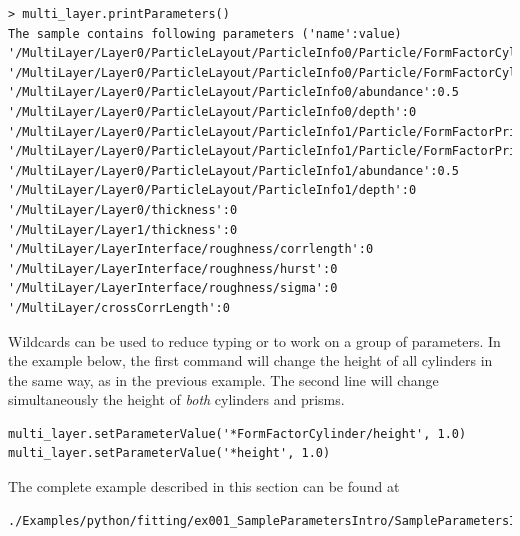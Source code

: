 \begin{lstlisting}[language=shell, style=commandline]
> multi_layer.printParameters()
The sample contains following parameters ('name':value)
'/MultiLayer/Layer0/ParticleLayout/ParticleInfo0/Particle/FormFactorCylinder/height':5
'/MultiLayer/Layer0/ParticleLayout/ParticleInfo0/Particle/FormFactorCylinder/radius':5
'/MultiLayer/Layer0/ParticleLayout/ParticleInfo0/abundance':0.5
'/MultiLayer/Layer0/ParticleLayout/ParticleInfo0/depth':0
'/MultiLayer/Layer0/ParticleLayout/ParticleInfo1/Particle/FormFactorPrism3/length':5
'/MultiLayer/Layer0/ParticleLayout/ParticleInfo1/Particle/FormFactorPrism3/height':5
'/MultiLayer/Layer0/ParticleLayout/ParticleInfo1/abundance':0.5
'/MultiLayer/Layer0/ParticleLayout/ParticleInfo1/depth':0
'/MultiLayer/Layer0/thickness':0
'/MultiLayer/Layer1/thickness':0
'/MultiLayer/LayerInterface/roughness/corrlength':0
'/MultiLayer/LayerInterface/roughness/hurst':0
'/MultiLayer/LayerInterface/roughness/sigma':0
'/MultiLayer/crossCorrLength':0
\end{lstlisting}

Wildcards  can be used to reduce typing or to work on a group
of parameters. In the example below, the first command will change the
height of all cylinders in the same way, as in the previous example. The second line will change simultaneously the height of {\it both} cylinders and prisms.
\begin{lstlisting}[language=shell, style=commandline]
multi_layer.setParameterValue('*FormFactorCylinder/height', 1.0)
multi_layer.setParameterValue('*height', 1.0)
\end{lstlisting}

The complete example described in this section can be found at 
\begin{lstlisting}[language=shell, style=commandline]
./Examples/python/fitting/ex001_SampleParametersIntro/SampleParametersIntro.py
\end{lstlisting}





